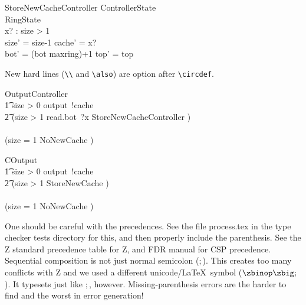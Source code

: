 \documentclass{article}
\begin{document}
\begin{schema}{StoreNewCacheController}
    \Delta ControllerState
            \\%
            \Xi RingState
            \\%
            x? : \nat
\where
            size > 1
            \\%
            size' = size-1 \land cache' = x?
            \\%
            bot' = (bot \mod maxring)+1 \land top' = top
\end{schema}

New hard lines (\verb'\\' and \verb'\also') are option after \verb'\circdef'.
%
\begin{circusaction}
    OutputController ~~\circdef~~ \\
            \t1 \lcircguard size > 0 \rcircguard \circguard output~!cache \then \\
            \t2 \circblockbegin
            (\lcircguard size > 1 \rcircguard \circguard read.bot~?x \then \lschexpract StoreNewCacheController \rschexpract) \\ 
            \extchoice \\
            (\lcircguard size = 1 \rcircguard \circguard \lschexpract NoNewCache \rschexpract)
            \circblockend
\end{circusaction}

\begin{circusaction}
    COutput ~~\circdef~~ \\
            \t1 \lcircguard size > 0 \rcircguard \circguard output~!cache \then \\
            \t2 \circblockbegin
            (\lcircguard size > 1 \rcircguard \circguard \lschexpract StoreNewCache \rschexpract) \\
            \extchoice \\
            (\lcircguard size = 1 \rcircguard \circguard \lschexpract NoNewCache \rschexpract)
            \circblockend
\end{circusaction}


One should be careful with the precedences. See the file \textsf{process.tex} in the type checker tests directory for this, 
and then properly include the parenthesis. See the Z standard precedence table for Z,  and FDR manual for CSP precedence.
Sequential composition \textsf{is not} just normal semicolon ($;$). This creates too many conflicts with Z and we used a different
unicode/\LaTeX\ symbol ($\circseq$). It typesets just like $;$, however.  Missing-parenthesis errors are the harder to find and the 
worst in error generation!
\end{document}
